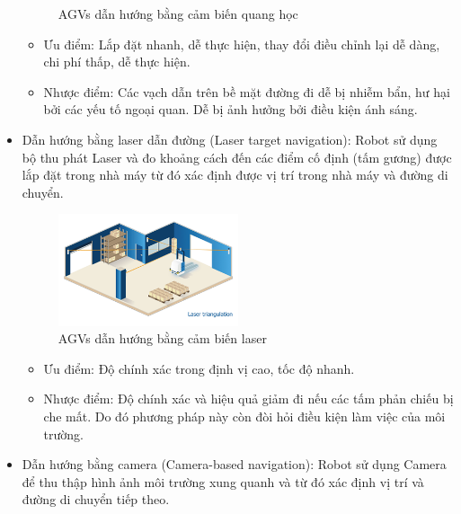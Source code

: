 \begin{itemize}
\begin{figure}[H]
\begin{subfigure}{0.7\textwidth}
                \label{chap1_pic7b}
                \end{subfigure}
                \caption{AGVs dẫn hướng bằng cảm biến quang học}
                \label{chap1_pic7}
            \end{figure}
        \begin{itemize}[label=\textendash]
            \item Ưu điểm: Lắp đặt nhanh, dễ thực hiện, thay đổi điều chỉnh lại dễ dàng, chi phí
            thấp, dễ thực hiện.
            \item Nhược điểm: Các vạch dẫn trên bề mặt đường đi dễ bị nhiễm bẩn, hư hại bởi các yếu
            tố ngoại quan. Dễ bị ảnh hưởng bởi điều kiện ánh sáng.
        \end{itemize}
        \item Dẫn hướng bằng laser dẫn đường (Laser target navigation): Robot sử dụng bộ thu phát Laser và đo khoảng cách đến các điểm cố định (tấm
        gương) được lắp đặt trong nhà máy từ đó xác định được vị trí trong nhà máy và đường
        di chuyển.
            \begin{figure}[H]
                \centering
                \includegraphics[width=0.5\textwidth]{pictures/chapter1/chapter1_pic_8a.png}
                \caption{AGVs dẫn hướng bằng cảm biến laser}
                \label{chap1_pic8}
            \end{figure}
        \begin{itemize}[label=\textendash]
            \item Ưu điểm: Độ chính xác trong định vị cao, tốc độ nhanh.
            \item Nhược điểm: Độ chính xác và hiệu quả giảm đi nếu các tấm phản chiếu bị che mất. 
            Do đó phương pháp này còn đòi hỏi điều kiện làm việc của môi trường.
        \end{itemize}
        \item Dẫn hướng bằng camera (Camera-based navigation): Robot sử dụng Camera để thu thập hình ảnh môi trường xung quanh và từ đó xác
        định vị trí và đường di chuyển tiếp theo.
            \begin{figure}[H]

\end{figure}
\end{itemize}
